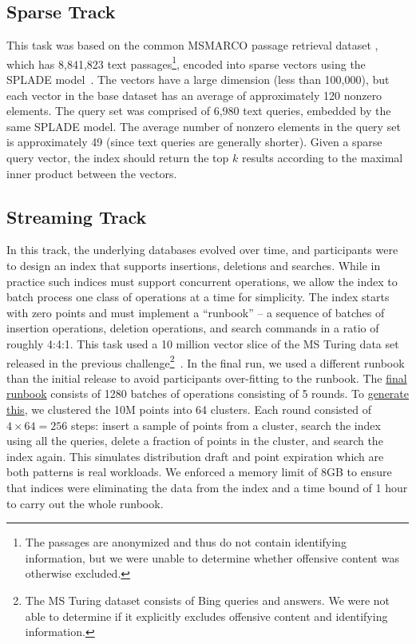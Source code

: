 \subsection{Sparse Track}

This task was based on the common MSMARCO passage retrieval dataset \cite{nguyen2016msmarco}, which has 8,841,823 text passages\footnote{The passages are anonymized and thus do not contain identifying information, but we were unable to determine whether offensive content was otherwise excluded.}, encoded into sparse vectors using the SPLADE model~\cite{formal2022splade}. The vectors have a large dimension (less than 100,000), but each vector in the base dataset has an average of approximately 120 nonzero elements. The query set was comprised of 6,980 text queries, embedded by the same SPLADE model. The average number of nonzero elements in the query set is approximately 49 (since text queries are generally shorter). 
Given a sparse query vector, the index should return the top $k$ results according to the maximal inner product between the vectors.


\subsection{Streaming Track}
In this track, the underlying databases evolved over time, and participants were to design an index
that supports insertions, deletions and searches.
%
While in practice such indices must support concurrent operations, we allow the index
to batch process one class of operations at a time for simplicity.
%
The index starts with zero points and must implement a ``runbook''  -- a sequence of batches of insertion operations,
 deletion operations, and search commands in a ratio of roughly 4:4:1.
%
This task used a 10 million vector slice of the MS Turing data set released in the previous challenge\footnote{The MS Turing dataset consists of Bing queries and answers.
We were not able to determine if it explicitly excludes offensive content and identifying information.}~\cite{DBLP:conf/nips/SimhadriWADBBCH21}.
%
 In the final run, we used a different runbook than the initial release to avoid participants over-fitting to the runbook.
% 
The \href{https://github.com/harsha-simhadri/big-ann-benchmarks/blob/v0.3.0/neurips23/streaming/final_runbook.yaml}{final runbook} consists
of 1280 batches of operations consisting of 5 rounds. 
%
To \href{https://github.com/harsha-simhadri/big-ann-benchmarks/blob/v0.3.0/neurips23/streaming/final_runbook_gen.py}{generate this},
we clustered the 10M points into 64 clusters.
%
Each round consisted of $4\times 64 = 256$ steps: insert a sample of points from a cluster, search the index using all the queries,
delete a fraction of points in the cluster, and search the index again.
%
This simulates distribution draft and point expiration which are both patterns is real workloads.
%
We enforced a memory limit of 8GB to ensure that indices were eliminating the data from the index and a time bound of 1 hour to carry out the whole runbook.

